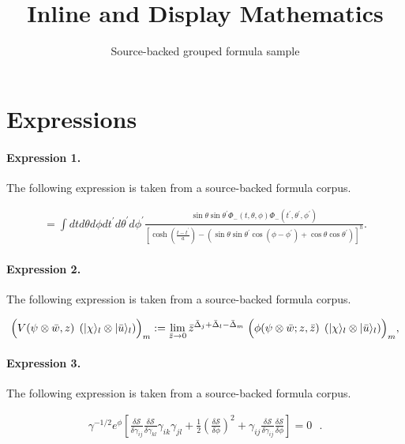 \documentclass[11pt]{article}
\title{Inline and Display Mathematics}
\author{Source-backed grouped formula sample}
\date{}
\begin{document}
\maketitle
\section{Expressions}
\paragraph{Expression 1.} The following expression is taken from a source-backed formula corpus.

\begin{align*}= \int dt d\theta d\phi dt^{\prime} d\theta^{\prime} d\phi^{\prime}\frac{\sin\theta\sin\theta^{\prime}\Phi_{-}(t,\theta,\phi)\Phi_{-}(t^{\prime},\theta^{\prime},\phi^{\prime})}{[\cosh(\frac{t-t^{\prime}}{a}) -(\sin \theta \sin\theta^{\prime}\cos (\phi-\phi^{\prime}) + \cos \theta \cos \theta^{\prime})]^{h}}.\end{align*}

\paragraph{Expression 2.} The following expression is taken from a source-backed formula corpus.

\begin{align*}\Bigl( V(\psi\otimes\bar{w},z)\;\left( |\chi\rangle_{l} \otimes|\bar{u}\rangle_{l}\right) \Bigr)_{m} : =\lim_{\bar{z}\rightarrow 0}\bar{z}^{\bar{\Delta}_{j} + \bar{\Delta}_{l} -\bar{\Delta}_{m}}\;\Bigl( \phi(\psi\otimes\bar{w};z,\bar{z})\;\left( |\chi\rangle_{l} \otimes|\bar{u}\rangle_{l} \right) \Bigr)_{m},\end{align*}

\paragraph{Expression 3.} The following expression is taken from a source-backed formula corpus.

\begin{align*}\gamma^{-1/2}e^{\phi} \left[ \frac{\delta \mathcal{S}}{\delta \gamma_{ij}}\frac{\delta \mathcal{S}}{\delta \gamma_{kl}} \gamma_{ik} \gamma_{jl}+\frac{1}{2}(\frac{\delta \mathcal{S}}{\delta \phi})^{2}+\gamma_{ij}\frac{\delta \mathcal{S}}{\delta \gamma_{ij}}\frac{\delta \mathcal{S}}{\delta \phi} \right] =0~~~.\end{align*}
\end{document}
